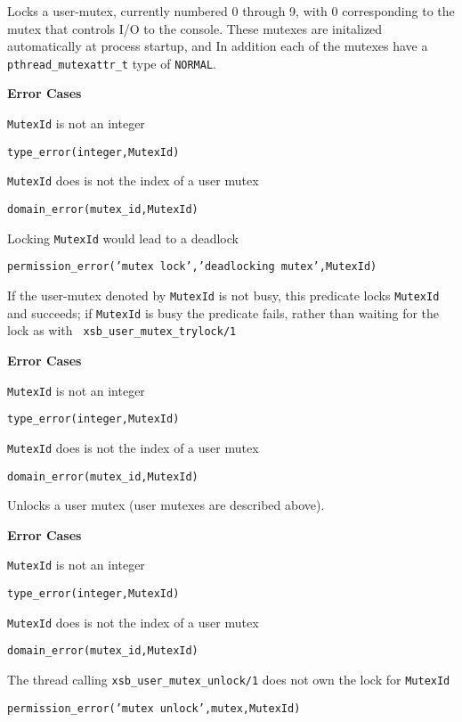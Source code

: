 \begin{description}
%
Locks a user-mutex, currently numbered 0 through 9, with 0
corresponding to the mutex that controls I/O to the console.  These
mutexes are initalized automatically at process startup, and In
addition each of the mutexes have a {\tt pthread\_mutexattr\_t} type
of {\tt NORMAL}.

{\bf Error Cases}
\bi
\item 	{\tt MutexId} is not an integer
\bi
\item 	{\tt type\_error(integer,MutexId)}
\ei
\item   {\tt MutexId} does is not the index of a user mutex
\bi
\item 	{\tt domain\_error(mutex\_id,MutexId)}
\ei
\item 	Locking {\tt MutexId} would lead to a deadlock
\bi
\item 	{\tt permission\_error('mutex lock','deadlocking mutex',MutexId)}
\ei
\ei

%
If the user-mutex denoted by {\tt MutexId} is not busy, this predicate
locks {\tt MutexId} and succeeds; if {\tt MutexId} is busy the
predicate fails, rather than waiting for the lock as with {\tt
  xsb\_user\_mutex\_trylock/1}

{\bf Error Cases}
\bi
\item 	{\tt MutexId} is not an integer
\bi
\item 	{\tt type\_error(integer,MutexId)}
\ei
\item   {\tt MutexId} does is not the index of a user mutex
\bi
\item 	{\tt domain\_error(mutex\_id,MutexId)}
\ei
\ei

%
Unlocks a user mutex (user mutexes are described above).

{\bf Error Cases}
\bi
\item 	{\tt MutexId} is not an integer
\bi
\item 	{\tt type\_error(integer,MutexId)}
\ei
\item   {\tt MutexId} does is not the index of a user mutex
\bi
\item 	{\tt domain\_error(mutex\_id,MutexId)}
\ei
\item 	The thread calling {\tt xsb\_user\_mutex\_unlock/1} does not
  own the lock for {\tt MutexId} 
\bi
\item 	{\tt permission\_error('mutex unlock',mutex,MutexId)}
\ei
\ei

\end{description}
